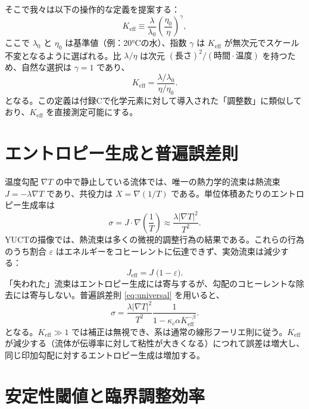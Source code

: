\documentclass[12pt,a4paper]{article}
\begin{document}
	そこで我々は以下の操作的な定義を提案する：
	\begin{equation}\label{eq:Keff-fluid}
		K_{\mathrm{eff}} \equiv \frac{\lambda}{\lambda_0} \left( \frac{\eta_0}{\eta} \right)^{\gamma},
	\end{equation}
	ここで \(\lambda_0\) と \(\eta_0\) は基準値（例：20°Cの水）、指数 \(\gamma\) は \(K_{\mathrm{eff}}\) が無次元でスケール不変となるように選ばれる。比 \(\lambda/\eta\) は次元 \((\text{長さ})^2/(\text{時間}\cdot\text{温度})\) を持つため、自然な選択は \(\gamma = 1\) であり、
	\begin{equation}\label{eq:Keff-fluid2}
		K_{\mathrm{eff}} = \frac{\lambda / \lambda_0}{\eta / \eta_0}.
	\end{equation}
	となる。この定義は付録Cで化学元素に対して導入された「調整数」に類似しており、\(K_{\mathrm{eff}}\) を直接測定可能にする。
	
	\section{エントロピー生成と普遍誤差則}
	
	温度勾配 \(\nabla T\) の中で静止している流体では、唯一の熱力学的流束は熱流束 \(J = -\lambda \nabla T\) であり、共役力は \(X = \nabla(1/T)\) である。単位体積あたりのエントロピー生成率は
	\begin{equation}\label{eq:sigma}
		\sigma = J \cdot \nabla\left(\frac{1}{T}\right) \approx \frac{\lambda |\nabla T|^2}{T^2}.
	\end{equation}
	YUCTの描像では、熱流束は多くの微視的調整行為の結果である。これらの行為のうち割合 \(\varepsilon\) はエネルギーをコヒーレントに伝達できず、実効流束は減少する：
	\begin{equation}\label{eq:J-effective}
		J_{\mathrm{eff}} = J \; \bigl(1 - \varepsilon\bigr).
	\end{equation}
	「失われた」流束はエントロピー生成には寄与するが、勾配のコヒーレントな除去には寄与しない。普遍誤差則 \eqref{eq:universal} を用いると、
	\begin{equation}\label{eq:sigma-K}
		\sigma = \frac{\lambda |\nabla T|^2}{T^2} \frac{1}{1 - \kappa_c\alpha K_{\mathrm{eff}}^{-\beta}}.
	\end{equation}
	となる。\(K_{\mathrm{eff}} \gg 1\) では補正は無視でき、系は通常の線形フーリエ則に従う。\(K_{\mathrm{eff}}\) が減少する（流体が伝導率に対して粘性が大きくなる）につれて誤差は増大し、同じ印加勾配に対するエントロピー生成は増加する。
	
	\section{安定性閾値と臨界調整効率}
	
\end{document}
